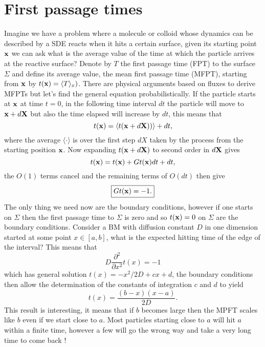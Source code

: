 \documentclass[11pt]{report}
\begin{document}
\section{First passage times}
Imagine we have a problem where a molecule or colloid whose dynamics can be described by a SDE reacts when it hits a certain surface, given its starting point ${\bf x}$ we can ask what is the average value of the time at which the particle arrives at the reactive 
surface? Denote by $T$ the first passage time (FPT) to the surface $\Sigma$ and define its average value, the mean first passage time (MFPT), starting from ${\bf x}$ by $t({\bf x}) = \langle T\rangle_{x})$. There are physical arguments based on fluxes to derive  MFPTs but let's find the general equation probabilistically. If the particle starts at ${\bf x}$ at time $t=0$, in the following time interval $dt$ the particle will move to ${\bf x}+ d{\bf X}$ but also the time elapsed will increase by $dt$, this means that
\begin{equation}
t({\bf x}) = \langle  t({\bf x}+d{\bf X}))\rangle + dt ,
\end{equation}
where the average $\langle \cdot\rangle$ is over the first step $dX$ taken by the process from the starting position ${\bf x}$.
Now expanding $t({\bf x}+d{\bf X})$ to second order in $d{\bf X}$ gives
\begin{equation}
t({\bf x}) = t({\bf x})+ Gt({\bf x}) dt + dt,
\end{equation}
the $O(1)$ terms cancel and the remaining terms of $O(dt)$ then give
\begin{equation}
\boxed{
Gt({\bf x}) = -1.}
\end{equation}
The only thing we need now are the boundary conditions, however if one starts on $\Sigma$ then the first passage time to $\Sigma$ is zero and so $t({\bf x}) =0$ on $\Sigma$ are the boundary conditions. Consider a BM with diffusion constant $D$ in one dimension started at some point $x\in [a,b]$, what is the expected hitting time of the edge of the interval? This means that 
\begin{equation}
D\frac{\partial^2}{\partial x^2} t(x) = -1
\end{equation}
which has general solution $ t(x) = -x^2/2D + cx +d$, the boundary conditions then allow the determination of the constants of integration $c$ and $d$ to yield
\begin{equation}
t(x) = \frac{(b-x)(x-a)}{2D}.
\end{equation}
This result is interesting, it means that if $b$ becomes large then the MPFT scales like $b$ even if we start close to $a$. Most particles starting close to $a$ will hit $a$ within a finite time, however a few will go the wrong way and take a very long time to come back !
\end{document}
